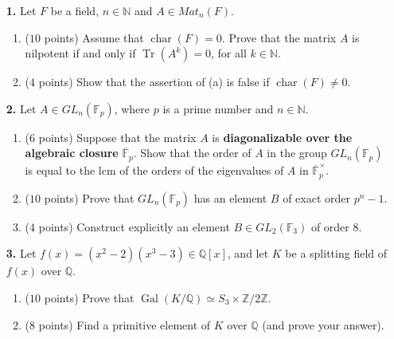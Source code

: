 \documentclass[12pt,
psamsfonts]{amsart}
\theoremstyle{remark}
\theoremstyle{definition}
\newcommand{\N}{\mathbb{N}\xspace}
\newcommand{\Z}{\mathbb{Z}\xspace}
\newcommand{\Q}{\mathbb{Q}\xspace}
\newcommand{\F}{\mathbb{F}\xspace}
\DeclareMathOperator{\Tr}{Tr}
\DeclareMathOperator{\ch}{char}
\DeclareMathOperator{\Gal}{Gal}
\numberwithin{equation}{section}
\begin{document}


\begin{enumerate}
\item[\textbf{1.}] Let $F$ be a field, $n\in\N$ and $A\in Mat_n(F)$.
\begin{enumerate}
\item ($10$ points) Assume that $\ch(F)=0$. Prove that the matrix $A$ is nilpotent if and only if $\Tr(A^k)=0$, for all $k\in\N$. 
\item ($4$ points) Show that the assertion of (a) is false if $\ch(F)\neq 0$. \\
\end{enumerate}

\item[\textbf{2.}] Let $A\in GL_n(\F_p)$, where $p$ is a prime number and $n\in\N$. 
\begin{enumerate}
\item ($6$ points) Suppose that the matrix $A$ is \textbf{diagonalizable over the algebraic closure} $\overline{\F}_p$.  Show that the order of $A$ in the group $GL_n(\F_p)$ is equal to the lcm of the orders of the eigenvalues of $A$ in $\overline{\F}_p^\times$. 
\item ($10$ points) Prove that $GL_n(\F_p)$ has an element $B$ of exact order $p^n-1$. 
\item ($4$ points) Construct explicitly an element $B\in GL_2(\F_3)$ of order $8$. \\
\end{enumerate}


\item[\textbf{3.}] Let $f(x)=(x^2-2)(x^3-3)\in\Q[x]$, and let $K$ be a splitting field of $f(x)$ over $\Q$. 
\begin{enumerate}
\item ($10$ points) Prove that $\Gal(K/\Q)\simeq S_3\times\Z/2\Z$.
\item ($8$ points) Find a primitive element of $K$ over $\Q$ (and prove your answer). \\
\end{enumerate} 


\end{enumerate}
\end{document}
